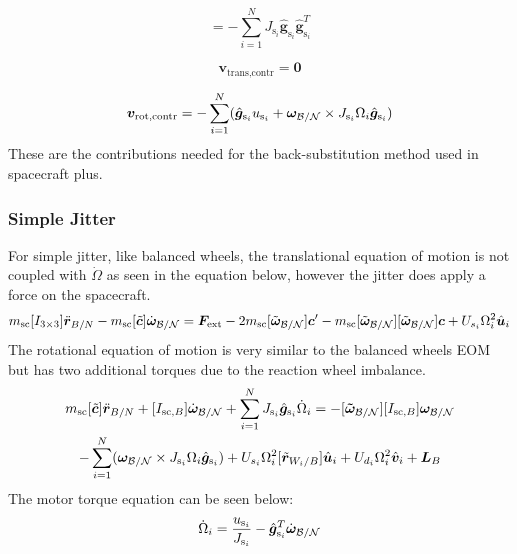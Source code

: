 \begin{equation}
[D_\text{contr}] = -\sum_{i=1}^{N}J_{\text{s}_i} \hat{\bm g}_{\text{s}_i} \hat{\bm g}_{\text{s}_i}^T
\end{equation}

\begin{equation}
\bm v_{\text{trans,contr}} = \bm 0
\end{equation}

\begin{equation}
\bm v_{\text{rot,contr}} =  - \sum_{i=1}^{N}(\hat{\bm g}_{\text{s}_i} u_{\text{s}_i} + \bm\omega_{\cal B/N}\times J_{\text{s}_i}\Omega_i\hat{\bm g}_{\text{s}_i})
\end{equation}
These are the contributions needed for the back-substitution method used in spacecraft plus.

\subsubsection{Simple Jitter}

For simple jitter, like balanced wheels, the translational equation of motion is not coupled with $\dot{\Omega}$ as seen in the equation below, however the jitter does apply a force on the spacecraft.
\begin{equation}
m_{\text{sc}} [I_{3 \times 3}]\ddot{\bm r}_{B/N}
-m_{\text{sc}} [\tilde{\bm{c}}] \dot{\bm\omega}_{\cal B/N} 
= \bm F_{\text{ext}}- 2 m_{\text{sc}} [\tilde{\bm\omega}_{\cal B/N}] \bm c'
-m_{\text{sc}} [\tilde{\bm\omega}_{\cal B/N}][\tilde{\bm\omega}_{\cal B/N}]\bm{c} + U_{s_i}\Omega_i^2\hat{\bm{u}}_i
\label{eq:Rbddot35}
\end{equation}
The rotational equation of motion is very similar to the balanced wheels EOM but has two additional torques due to the reaction wheel imbalance. 
\begin{multline}
m_{\text{sc}}[\tilde{\bm{c}}] \ddot{\bm r}_{B/N}
+[I_{\text{sc},B}] \dot{\bm\omega}_{\cal B/N}
+\sum_{i=1}^{N}J_{\text{s}_i} \hat{\bm g}_{\text{s}_i}\dot{\Omega}_i
= -[\bm{\tilde{\omega}}_{\cal B/N}] [I_{\text{sc},B}] \bm\omega_{\cal B/N} \\
- \sum_{i=1}^{N}(\bm\omega_{\cal B/N}\times J_{\text{s}_i}\Omega_i\hat{\bm g}_{\text{s}_i})
+ U_{s_i}\Omega_i^2[\tilde{\bm{r}}_{W_i/B}]\hat{\bm{u}}_i + U_{d_i}\Omega_i^2\hat{\bm{v}}_i + \bm{L}_B
\label{eq:Final7}
\end{multline}
The motor torque equation can be seen below:
\begin{equation}
\dot{\Omega}_i = \frac{u_{\text{s}_i}}{J_{\text{s}_i}}-\hat{\bm g}_{\text{s}_i}^T \dot{\bm{\omega}}_{\cal B/N}
\label{eq:mtorque}
\end{equation}

